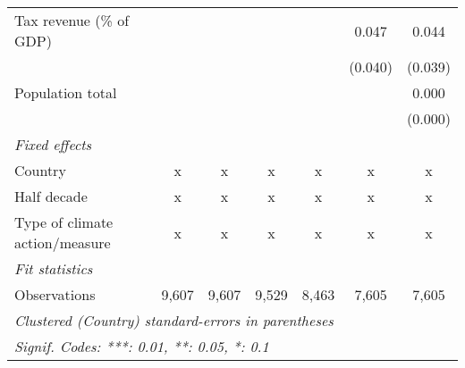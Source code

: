 \begin{tabular}{lcccccc}
   Tax revenue (\% of GDP)                    &         &         &               &              & 0.047       & 0.044\\   
                                              &         &         &               &              & (0.040)     & (0.039)\\   
   Population total                           &         &         &               &              &             & 0.000\\   
                                              &         &         &               &              &             & (0.000)\\   
   \emph{Fixed effects}\\
   Country                                    & x       & x       & x             & x            & x           & x\\  
   Half decade                                & x       & x       & x             & x            & x           & x\\  
   Type of climate action/measure             & x       & x       & x             & x            & x           & x\\  
   \midrule \emph{Fit statistics}\\
   Observations                               & 9,607   & 9,607   & 9,529         & 8,463        & 7,605       & 7,605\\  
   \midrule
   \multicolumn{7}{l}{\emph{Clustered (Country) standard-errors in parentheses}}\\
   \multicolumn{7}{l}{\emph{Signif. Codes: ***: 0.01, **: 0.05, *: 0.1}}\\
\end{tabular}
\par\endgroup


